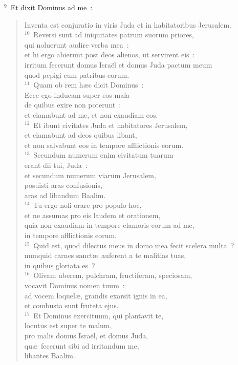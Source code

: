 ${}^{9}$~Et dixit Dominus ad me~: \begin{flushleft}\begin{verse}Inventa est conjuratio in viris Juda et in habitatoribus Jerusalem.\\
${}^{10}$~Reversi sunt ad iniquitates patrum suorum priores,\\ qui noluerunt audire verba mea~:\\ et hi ergo abierunt post deos alienos, ut servirent eis~:\\ irritum fecerunt domus Isra\"el et domus Juda pactum meum\\ quod pepigi cum patribus eorum.\\
${}^{11}$~Quam ob rem h\ae c dicit Dominus~:\\ Ecce ego inducam super eos mala\\ de quibus exire non poterunt~:\\ et clamabunt ad me, et non exaudiam eos.\\
${}^{12}$~Et ibunt civitates Juda et habitatores Jerusalem,\\ et clamabunt ad deos quibus libant,\\ et non salvabunt eos in tempore afflictionis eorum.\\
${}^{13}$~Secundum numerum enim civitatum tuarum\\ erant dii tui, Juda~:\\ et secundum numerum viarum Jerusalem,\\ posuisti aras confusionis,\\ aras ad libandum Baalim.\\
${}^{14}$~Tu ergo noli orare pro populo hoc,\\ et ne assumas pro eis laudem et orationem,\\ quia non exaudiam in tempore clamoris eorum ad me,\\ in tempore afflictionis eorum.\\
${}^{15}$~Quid est, quod dilectus meus in domo mea fecit scelera multa~?\\ numquid carnes sanct\ae\ auferent a te malitias tuas,\\ in quibus gloriata es~?\\
${}^{16}$~Olivam uberem, pulchram, fructiferam, speciosam,\\ vocavit Dominus nomen tuum~:\\ ad vocem loquel\ae , grandis exarsit ignis in ea,\\ et combusta sunt fruteta ejus.\\
${}^{17}$~Et Dominus exercituum, qui plantavit te,\\ locutus est super te malum,\\ pro malis domus Isra\"el, et domus Juda,\\ qu\ae\ fecerunt sibi ad irritandum me,\\ libantes Baalim.\end{verse}\end{flushleft}


